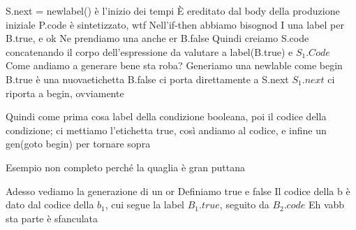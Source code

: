 \documentclass[class=book, crop=false, oneside, 12pt]{standalone}
\begin{document}
S.next = newlabel() è l'inizio dei tempi
È ereditato dal body della produzione iniziale
P.code è sintetizzato, wtf
Nell'if-then abbiamo bisognod I una label per B.true, e ok
Ne prendiamo una anche er B.false
Quindi creiamo S.code concatenando il corpo dell'espressione da valutare a label(B.true) e \(S_1.Code\)
Come andiamo a generare bene sta roba?
Generiamo una newlable come begin
B.true è una nuovaetichetta
B.false ci porta direttamente a S.next
\(S_1.next\) ci riporta a begin, ovviamente

Quindi come prima cosa label della condizione booleana, poi il codice della condizione; ci mettiamo l'etichetta true, così andiamo al codice, e infine un gen(goto begin) per tornare sopra

Esempio non completo perché la quaglia è gran puttana

Adesso vediamo la generazione di un or
Definiamo true e false
Il codice della b è dato dal codice della \(b_1\), cui segue la label \(B_1.true\), seguito da \(B_2.code\)
Eh vabb sta parte è sfanculata
\end{document}
